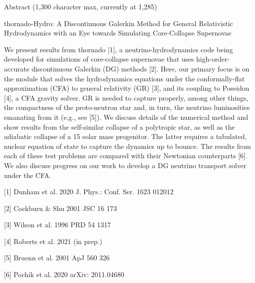 \documentclass{article}
\begin{document}
\begin{center}
Abstract (1,300 character max, currently at 1,285)
\end{center}

\begin{center}
thornado-Hydro: A Discontinuous Galerkin Method for General Relativistic Hydrodynamics with an Eye towards Simulating Core-Collapse Supernovae
\end{center}

We present results from thornado [1], a neutrino-hydrodynamics code being developed for simulations of core-collapse supernovae that uses high-order-accurate discontinuous Galerkin (DG) methods [2]. Here, our primary focus is on the module that solves the hydrodynamics equations under the conformally-flat approximation (CFA) to general relativity (GR) [3], and its coupling to Poseidon [4], a CFA gravity solver. GR is needed to capture properly, among other things, the compactness of the proto-neutron star and, in turn, the neutrino luminosities emanating from it (e.g., see [5]). We discuss details of the numerical method and show results from the self-similar collapse of a polytropic star, as well as the adiabatic collapse of a 15 solar mass progenitor. The latter requires a tabulated, nuclear equation of state to capture the dynamics up to bounce. The results from each of these test problems are compared with their Newtonian counterparts [6]. We also discuss progress on our work to develop a DG neutrino transport solver under the CFA.

[1] Dunham et al. 2020 J. Phys.: Conf. Ser. 1623 012012

[2] Cockburn \& Shu 2001 JSC 16 173

[3] Wilson et al. 1996 PRD 54 1317

[4] Roberts et al. 2021 (in prep.)

[5] Bruenn et al. 2001 ApJ 560 326

[6] Pochik et al. 2020 arXiv: 2011.04680
\end{document}
